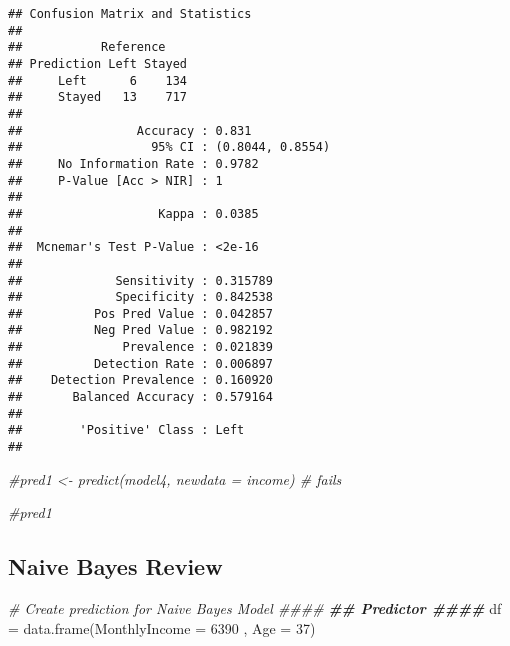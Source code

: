 \documentclass[
]{article}
\newenvironment{Shaded}{\begin{snugshade}}{\end{snugshade}}
\newcommand{\AttributeTok}[1]{\textcolor[rgb]{0.77,0.63,0.00}{#1}}
\newcommand{\CommentTok}[1]{\textcolor[rgb]{0.56,0.35,0.01}{\textit{#1}}}
\newcommand{\DecValTok}[1]{\textcolor[rgb]{0.00,0.00,0.81}{#1}}
\newcommand{\DocumentationTok}[1]{\textcolor[rgb]{0.56,0.35,0.01}{\textbf{\textit{#1}}}}
\newcommand{\FunctionTok}[1]{\textcolor[rgb]{0.00,0.00,0.00}{#1}}
\newcommand{\NormalTok}[1]{#1}
\newcommand{\OtherTok}[1]{\textcolor[rgb]{0.56,0.35,0.01}{#1}}
\begin{document}
\begin{verbatim}
## Confusion Matrix and Statistics
## 
##           Reference
## Prediction Left Stayed
##     Left      6    134
##     Stayed   13    717
##                                           
##                Accuracy : 0.831           
##                  95% CI : (0.8044, 0.8554)
##     No Information Rate : 0.9782          
##     P-Value [Acc > NIR] : 1               
##                                           
##                   Kappa : 0.0385          
##                                           
##  Mcnemar's Test P-Value : <2e-16          
##                                           
##             Sensitivity : 0.315789        
##             Specificity : 0.842538        
##          Pos Pred Value : 0.042857        
##          Neg Pred Value : 0.982192        
##              Prevalence : 0.021839        
##          Detection Rate : 0.006897        
##    Detection Prevalence : 0.160920        
##       Balanced Accuracy : 0.579164        
##                                           
##        'Positive' Class : Left            
## 
\end{verbatim}

\begin{Shaded}
\begin{Highlighting}[]
\CommentTok{\#pred1 \textless{}{-} predict(model4, newdata = income) \# fails}

\CommentTok{\#pred1}
\end{Highlighting}
\end{Shaded}

\hypertarget{naive-bayes-review}{%
\subsection{Naive Bayes Review}\label{naive-bayes-review}}

\begin{Shaded}
\begin{Highlighting}[]
\CommentTok{\# Create prediction for Naive Bayes Model \#\#\#\#}
\DocumentationTok{\#\# Predictor \#\#\#\#}
\NormalTok{df }\OtherTok{=} \FunctionTok{data.frame}\NormalTok{(}\AttributeTok{MonthlyIncome =} \DecValTok{6390}\NormalTok{ , }\AttributeTok{Age =} \DecValTok{37}\NormalTok{)}
\end{Highlighting}
\end{Shaded}
\end{document}
